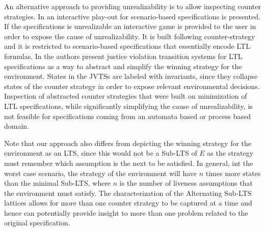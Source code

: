 An alternative approach to providing unrealizability is to allow inspecting counter strategies. 
 In \cite{DBLP:conf/emsoft/CernyGHRT12} an interactive play-out for scenario-based specifications is presented.  If the specifications is unrealizable an interactive game is provided to the user in order to expose the cause of unrealizability.  It is built following \cite{DBLP:conf/hvc/KonighoferHB10} counter-strategy and it is restricted to scenario-based specifications that essentially encode LTL formulas.
 In \cite{DBLP:conf/sigsoft/KuventMR17} the authors present
 justice violation transition systems for LTL specifications as a way to abstract
 and simplify the winning strategy for the environment.
 States in the JVTSs are labeled with invariants, since
 they  collapse states of the counter strategy
 in order to expose relevant environmental decisions.
Inspection of abstracted counter strategies that were built on minimization of LTL specifications, while significantly simplifying the cause of unrealizability, is not feasible for specifications coming from an automata based or process based domain. 

 Note that our approach also differs from depicting the winning strategy for the environment as an LTS, since this would not be a Sub-LTS of $E$ as the strategy must remember which assumption is the next to be satisfied. In general, int the worst case scenario, the strategy of the environment will have $n$ times more states than the minimal Sub-LTS, where $n$ is the number of liveness assumptions that the environment must satisfy. The characterization of the Alternating Sub-LTS lattices allows for more than one counter strategy to be captured at a time and hence can potentially provide insight to more than one problem related to the original specification. 
 



